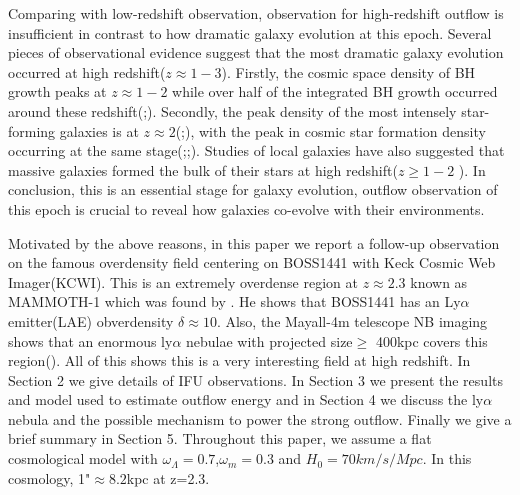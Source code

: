 \documentclass[../main.tex]{subfiles}
\begin{document}
Comparing with low-redshift observation, observation for high-redshift outflow is insufficient in contrast to how dramatic galaxy evolution at this epoch. Several pieces of observational evidence suggest that the most dramatic galaxy evolution occurred at high redshift($z \approx 1-3$). Firstly, the cosmic space density of BH growth peaks at $z \approx 1-2$ while over half of the integrated BH growth occurred around these redshift(\cite{schmidt1983quasar};\cite{richards2006sloan}). Secondly, the peak density of the most intensely star-forming galaxies is at $z \approx 2$(\cite{chapman2005redshift};\cite{wardlow2011laboca}), with the peak in cosmic star formation density occurring at the same stage(\cite{madau1996high};\cite{lilly1999canada};\cite{madau2014cosmic}). Studies of local galaxies have also suggested that massive galaxies formed the bulk of their stars at high redshift($z \geqslant 1-2$ ). In conclusion, this is an essential stage for galaxy evolution, outflow observation of this epoch is crucial to reveal how galaxies co-evolve with their environments. 

Motivated by the above reasons, in this paper we report a follow-up observation on the famous overdensity field centering on BOSS1441 with Keck Cosmic Web Imager(KCWI). This is an extremely overdense region at $z \approx 2.3$ known as MAMMOTH-1 which was found by \cite{cai2015mapping}. He shows that BOSS1441 has an Ly$\alpha$ emitter(LAE) obverdensity $\delta \approx 10$. Also, the Mayall-4m telescope NB imaging shows that an enormous ly$\alpha$ nebulae with projected size$\geqslant$ 400kpc covers this region(\cite{cai2017discovery}). All of this shows this is a very interesting field at high redshift. In Section 2 we give details of IFU observations. In Section 3 we present the results and model used to estimate outflow energy and in Section 4 we discuss the ly$\alpha$ nebula and the possible mechanism to power the strong outflow. Finally we give a brief summary in Section 5. Throughout this paper, we assume a flat cosmological model with $\omega_{\Lambda}=0.7$,$\omega_{m}=0.3$ and $H_{0}=70 km/s/Mpc$. In this cosmology, 1"$ \approx 8.2$kpc at z=2.3.



















\end{document}
